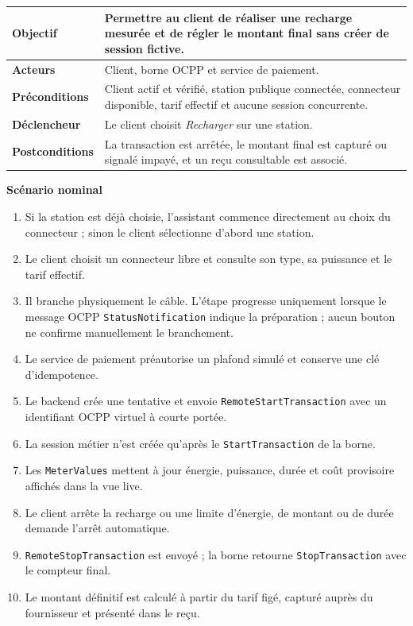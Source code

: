\begin{table}[H]
  \centering
  \begin{tabularx}{\textwidth}{|C{3.3cm}|Y|}
    \hline
    \textbf{Objectif} & Permettre au client de réaliser une recharge mesurée et de
    régler le montant final sans créer de session fictive.\\\hline
    \textbf{Acteurs} & Client, borne OCPP et service de paiement.\\\hline
    \textbf{Préconditions} & Client actif et vérifié, station publique connectée,
    connecteur disponible, tarif effectif et aucune session concurrente.\\\hline
    \textbf{Déclencheur} & Le client choisit \emph{Recharger} sur une station.\\\hline
    \textbf{Postconditions} & La transaction est arrêtée, le montant final est
    capturé ou signalé impayé, et un reçu consultable est associé.\\\hline

  \end{tabularx}
\end{table}

\textbf{Scénario nominal}
\begin{enumerate}[leftmargin=8mm]
  \item Si la station est déjà choisie, l'assistant commence directement au choix du
  connecteur ; sinon le client sélectionne d'abord une station.
  \item Le client choisit un connecteur libre et consulte son type, sa puissance et le
  tarif effectif.
  \item Il branche physiquement le câble. L'étape progresse uniquement lorsque le
  message OCPP \texttt{Status\-Notification} indique la préparation ; aucun bouton ne confirme
  manuellement le branchement.
  \item Le service de paiement préautorise un plafond simulé et conserve une clé
  d'idempotence.
  \item Le backend crée une tentative et envoie
  \texttt{RemoteStartTransaction} avec un identifiant OCPP virtuel à courte portée.
  \item La session métier n'est créée qu'après le
  \texttt{StartTransaction} de la borne.
  \item Les \texttt{MeterValues} mettent à jour énergie, puissance, durée et coût
  provisoire affichés dans la vue live.
  \item Le client arrête la recharge ou une limite d'énergie, de montant ou de durée
  demande l'arrêt automatique.
  \item \texttt{RemoteStopTransaction} est envoyé ; la borne retourne
  \texttt{StopTransaction} avec le compteur final.
  \item Le montant définitif est calculé à partir du tarif figé, capturé auprès du
  fournisseur et présenté dans le reçu.
\end{enumerate}

